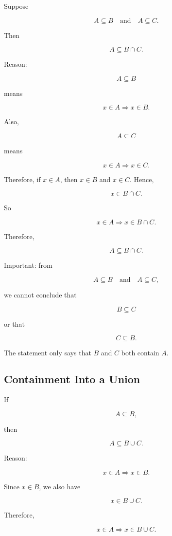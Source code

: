 \documentclass{article}
\begin{document}
	Suppose
	
	\[
	A \subseteq B
	\quad \text{and} \quad
	A \subseteq C.
	\]
	
	Then
	
	\[
	A \subseteq B \cap C.
	\]
	
	Reason:
	
	\[
	A \subseteq B
	\]
	
	means
	
	\[
	x \in A \Rightarrow x \in B.
	\]
	
	Also,
	
	\[
	A \subseteq C
	\]
	
	means
	
	\[
	x \in A \Rightarrow x \in C.
	\]
	
	Therefore, if \(x \in A\), then \(x \in B\) and \(x \in C\). Hence,
	
	\[
	x \in B \cap C.
	\]
	
	So
	
	\[
	x \in A \Rightarrow x \in B \cap C.
	\]
	
	Therefore,
	
	\[
	A \subseteq B \cap C.
	\]
	
	Important: from
	
	\[
	A \subseteq B
	\quad \text{and} \quad
	A \subseteq C,
	\]
	
	we cannot conclude that
	
	\[
	B \subseteq C
	\]
	
	or that
	
	\[
	C \subseteq B.
	\]
	
	The statement only says that \(B\) and \(C\) both contain \(A\).
	
	\subsection{Containment Into a Union}
	
	If
	
	\[
	A \subseteq B,
	\]
	
	then
	
	\[
	A \subseteq B \cup C.
	\]
	
	Reason:
	
	\[
	x \in A \Rightarrow x \in B.
	\]
	
	Since \(x \in B\), we also have
	
	\[
	x \in B \cup C.
	\]
	
	Therefore,
	
	\[
	x \in A \Rightarrow x \in B \cup C.
	\]
	
\end{document}
